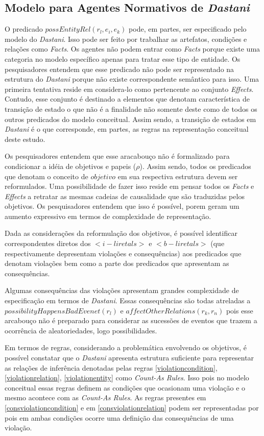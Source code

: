 \subsection{Modelo para Agentes Normativos de \textit{Dastani}}

O predicado $possEntityRel(r_l,e_i,e_k)$ pode, em partes, ser especificado pelo modelo do \textit{Dastani}. Isso pode ser feito por trabalhar as artefatos, condições e relações como \textit{Facts}. Os agentes não podem entrar como \textit{Facts} porque existe uma categoria no modelo específico apenas para tratar esse tipo de entidade. Os pesquisadores entendem que esse predicado não pode ser representado na estrutura do \textit{Dastani} porque não existe correspondente semântico para isso. Uma primeira tentativa reside em considera-lo como pertencente ao conjunto \textit{Effects}. Contudo, esse conjunto é destinado a elementos que denotam característica 
de transição de estado o que não é a finalidade não somente deste como de todos os outros predicados do modelo conceitual. Assim sendo, a transição de estados em  \textit{Dastani} é o que corresponde, em partes, as regras na representação conceitual deste estudo. 

Os pesquisadores entendem que esse aracabouço não é formalizado para condicionar a idéia de objetivos e papeis ($\rho$). Assim sendo, todos os predicados que denotam o conceito de $objetivo$ em sua respectiva estrutura devem ser reformulados. Uma possibilidade de fazer isso reside em pensar todos os \textit{Facts} e \textit{Effects} a retratar as mesmas cadeias de causalidade que são traduzidas pelos objetivos. Os pesquisadores entendem que isso é possível, porem geram um aumento expressivo em termos de complexidade de representação. 

Dada as considerações da reformulação dos objetivos, é possível identificar correspondentes diretos dos $<i-liretals>$  e $<b-liretals>$ (que respectivamente depresentam violações e consequências) aos predicados que denotam violações bem como a parte dos predicados que apresentam as consequências. 

Algumas consequências das violações apresentam grandes complexidade de especificação em termos de \textit{Dastani}. Essas consequências são todas atreladas a $possibilityHappensBadEvenet(r_l)$ e $affectOtherRelations(r_k,r_n)$ pois esse arcabouço não é preparado para considerar as sucessões de eventos que trazem a ocorrência de aleatoriedades, logo possibilidades. 

Em termos de regras, considerando a problemática envolvendo os objetivos, é possível constatar que o \textit{Dastani} apresenta estrutura suficiente para representar as relações de inferência denotadas pelas regras \ref{violationcondition}, \ref{violationrelation}, \ref{violationentity} como \textit{Count-As Rules}. Isso pois no modelo conceitual essas regras definem as condições que ocasionam uma violação e o mesmo acontece com as \textit{Count-As Rules}. As regras presentes em \ref{consviolationcondition} e em \ref{consviolationrelation} podem ser representadas por  pois em ambas condições ocorre uma definição das consequências de uma violação. 